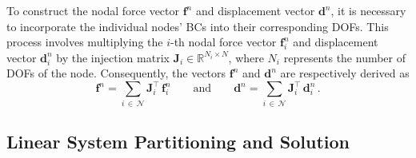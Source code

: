To construct the nodal force vector $\mathbf{f}^{n}$ and displacement vector $\mathbf{d}^{n}$, it is necessary to incorporate the individual nodes' \acp{BC} into their corresponding \acp{DOF}. This process involves multiplying the $i$-th nodal force vector $\mathbf{f}^{n}_{i}$ and displacement vector $\mathbf{d}^{n}_{i}$ by the injection matrix $\mathbf{J}_{i} \in \mathbb{R}^{N_i \times N}$, where $N_i$ represents the number of \acp{DOF} of the node. Consequently, the vectors $\mathbf{f}^{n}$ and $\mathbf{d}^{n}$ are respectively derived as
%
\begin{equation*}
  \mathbf{f}^{n} = \sum_{i \, \in \, \mathcal{N}} \mathbf{J}_{i}^\top \, \mathbf{f}^{n}_{i}
  \qquad \text{and} \qquad
  \mathbf{d}^{n} = \sum_{i \, \in \, \mathcal{N}} \mathbf{J}_{i}^\top \, \mathbf{d}^{n}_{i} \, \text{.}
\end{equation*}

\subsection{Linear System Partitioning and Solution}

